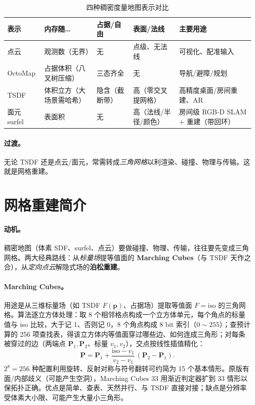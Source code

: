 \begin{table}[H]\centering\small
\caption{四种稠密度量地图表示对比}
\label{tab:dense-repr-compare}
\begin{tabular}{p{} p{} p{} p{} p{}}
\toprule
表示 & 内存随… & 占据/自由 & 表面/法线 & 主要用途 \\
\midrule
点云 & 观测数（无界） & 无 & 点级、无法线 & 可视化、配准输入 \\
OctoMap & 占据体积（八叉树压缩） & 三态齐全 & 无 & 导航/避障/规划 \\
TSDF & 体积立方（大场景需哈希） & 隐含（截断带） & 高（零交叉提网格） & 高精度桌面/房间重建、AR \\
面元 surfel & 表面积 & 无 & 高（法线/半径/颜色） & 房间级 RGB-D SLAM $+$ 重建（带回环） \\
\bottomrule
\end{tabular}
\end{table}

\paragraph{过渡。}
无论 TSDF 还是点云/面元，常需转成\emph{三角网格}以利渲染、碰撞、物理与传输。这就是网格重建。

\section{网格重建简介}
\label{sec:dense-mesh}

\paragraph{动机。}
稠密地图（体素 SDF、surfel、点云）要做碰撞、物理、传输，往往要先变成三角网格。两大经典路线：从\emph{标量场}提等值面的 \textbf{Marching Cubes}（与 TSDF 天作之合），从\emph{定向点云}解隐式场的\textbf{泊松重建}。

\paragraph{Marching Cubes。}
用途是从三维标量场（如 TSDF $F(\mathbf{p})$、占据场）提取等值面 $F=\text{iso}$ 的三角网格\cite{lorensen1987marchingcubes}。算法逐立方体处理：取 8 个相邻格点构成一个立方体单元，每个角点的标量值与 iso 比较，大于记 1、否则记 0，8 个角点构成 8 bit 索引（$0\sim255$）；查预计算的 256 项查找表，得该立方体内等值面穿过哪些边、如何连成三角形；对每条被穿过的边（两端点 $\mathbf{P}_1,\mathbf{P}_2$、标量 $v_1,v_2$），交点按线性插值精化：
\begin{equation}
  \mathbf{P}=\mathbf{P}_1+\frac{\text{iso}-v_1}{v_2-v_1}\,(\mathbf{P}_2-\mathbf{P}_1).
  \label{eq:dense-mc-interp}
\end{equation}
$2^8=256$ 种配置利用旋转、反射对称与符号翻转可约简为 15 个基本情形。原版有面/内部歧义（可能产生空洞），Marching Cubes 33 用渐近判定器扩到 33 情形以保拓扑正确。优点是简单、查表、天然并行、与 TSDF 直接对接；缺点是分辨率受体素大小限、可能产生大量小三角形。

